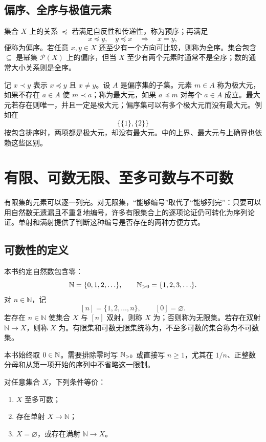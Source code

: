 \subsection{偏序、全序与极值元素}

集合 \(X\) 上的关系 \(\preccurlyeq\) 若满足自反性和传递性，称为预序；再满足
\[
  x\preccurlyeq y,\quad y\preccurlyeq x\quad\Longrightarrow\quad x=y,
\]
便称为偏序。若任意 \(x,y\in X\) 还至少有一个方向可比较，则称为全序。集合包含 \(\subseteq\) 是幂集 \(\mathcal P(X)\) 上的偏序，但当 \(X\) 至少有两个元素时通常不是全序；数的通常大小关系则是全序。

记 \(x\prec y\) 表示 \(x\preccurlyeq y\) 且 \(x\ne y\)。设 \(A\) 是偏序集的子集。元素 \(m\in A\) 称为极大元，如果不存在 \(a\in A\) 使 \(m\prec a\)；称为最大元，如果 \(a\preccurlyeq m\) 对每个 \(a\in A\) 成立。最大元若存在则唯一，并且一定是极大元；偏序集可以有多个极大元而没有最大元。例如在
\[
  \bigl\{\{1\},\{2\}\bigr\}
\]
按包含排序时，两项都是极大元，却没有最大元。中的上界、最大元与上确界也依赖这些区别。

\section{有限、可数无限、至多可数与不可数}

有限集的元素可以逐一列完。对无限集，“能够编号”取代了“能够列完”：只要可以用自然数无遗漏且不重复地编号，许多有限集合上的逐项论证仍可转化为序列论证。单射和满射提供了判断这种编号是否存在的两种方便方式。

\subsection{可数性的定义}

本书约定自然数包含零：
\[
  \mathbb N=\{0,1,2,\ldots\},\qquad
  \mathbb{N}_{>0}=\{1,2,3,\ldots\}.
\]
对 \(n\in\mathbb N\)，记
\[
  [n]=\{1,2,\ldots,n\},\qquad [0]=\varnothing.
\]
若存在 \(n\in\mathbb N\) 使集合 \(X\) 与 \([n]\) 双射，则称 \(X\) 为；否则称为无限集。若存在双射 \(\mathbb N\to X\)，则称 \(X\) 为。有限集和可数无限集统称为，不至多可数的集合称为不可数集。

\begin{notationbox}[自然数与正整数]
本书始终取 \(0\in\mathbb{N}\)。需要排除零时写 \(\mathbb{N}_{>0}\) 或直接写 \(n\ge1\)，尤其在 \(1/n\)、正整数分母和从第一项开始的序列中不省略这一限制。
\end{notationbox}

\begin{proposition}[至多可数的等价刻画]
对任意集合 \(X\)，下列条件等价：
\begin{enumerate}
  \item \(X\) 至多可数；
  \item 存在单射 \(X\to\mathbb N\)；
  \item \(X=\varnothing\)，或存在满射 \(\mathbb N\to X\)。
\end{enumerate}
\end{proposition}

